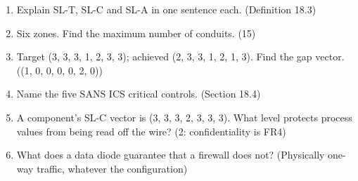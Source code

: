 
\begin{enumerate}
\item Explain SL-T, SL-C and SL-A in one sentence each. (Definition 18.3)
\item Six zones. Find the maximum number of conduits. (15)
\item Target (3, 3, 3, 1, 2, 3, 3); achieved (2, 3, 3, 1, 2, 1, 3). Find the gap vector. ((1, 0, 0, 0, 0, 2, 0))
\item Name the five SANS ICS critical controls. (Section 18.4)
\item A component's SL-C vector is (3, 3, 3, 2, 3, 3, 3). What level protects process values from being read off the wire? (2: confidentiality is FR4)
\item What does a data diode guarantee that a firewall does not? (Physically one-way traffic, whatever the configuration)
\end{enumerate}
